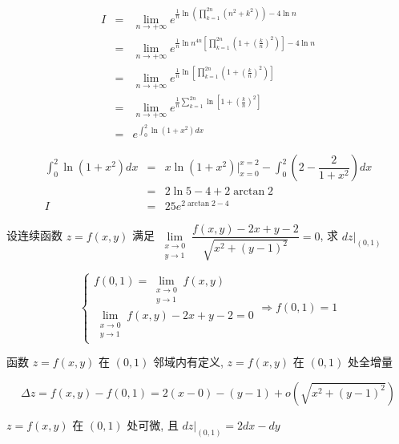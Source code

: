 \begin{solution}
	
	\begin{eqnarray*}
		I & = & \lim\limits_{n \to +\infty}e^{\frac{1}{n}\ln(\prod\limits_{k=1}^{2n}(n^2+k^2)) - 4\ln n}\\
		  & = & \lim\limits_{n \to +\infty}e^{\frac{1}{n}\ln n^{4n}\left[\prod\limits_{k=1}^{2n}\left(1+(\frac{k}{n})^{2}\right)\right] - 4\ln n}\\
		  & = & \lim\limits_{n \to +\infty}e^{\frac{1}{n}\ln\left[\prod\limits_{k=1}^{2n}\left(1+(\frac{k}{n})^{2}\right)\right]}\\
		  & = & \lim\limits_{n \to +\infty}e^{\frac{1}{n}\sum\limits_{k=1}^{2n}\ln\left[1+(\frac{k}{n})^{2}\right]}\\
		  & = & e^{\int_{0}^{2}\ln(1+x^{2})dx}
	\end{eqnarray*}
	
	\begin{eqnarray*}
		\int_{0}^{2}\ln(1+x^{2})dx & = & x\ln(1+x^{2})\big|_{x=0}^{x=2} - \int_{0}^{2}(2-\dfrac{2}{1+x^{2}})dx\\
		& = & 2\ln 5 - 4 +2\arctan 2\\
		I & = & 25e^{2\arctan 2-4}
	\end{eqnarray*}
\end{solution}

\begin{example}[][Exam: 29.4.6]
	设连续函数 $z=f(x,y)$ 满足 $\lim\limits_{\substack{x\to 0\\y \to 1}}\dfrac{f(x,y)-2x+y-2}{\sqrt{x^2+(y-1)^2}}=0$, 求 $dz\big|_{(0,1)}$
\end{example}

\begin{solution}
	
	$$\begin{cases}
	  f(0,1) = \lim\limits_{\substack{x\to 0\\y\to 1}}f(x,y) \\
	  \lim\limits_{\substack{x\to 0\\y\to 1}}f(x,y)-2x+y-2 = 0
	\end{cases}\Rightarrow f(0,1) = 1$$

	函数 $z = f(x,y)$ 在 $(0,1)$ 邻域内有定义, $z = f(x,y)$ 在 $(0,1)$ 处全增量

	$$\Delta z = f(x,y) - f(0,1) = 2(x-0) -(y-1) + o(\sqrt{x^{2}+(y-1)^{2}})$$

	$z = f(x,y)$ 在 $(0,1)$ 处可微, 且 $dz\big|_{(0,1)} = 2dx -dy$
\end{solution}

